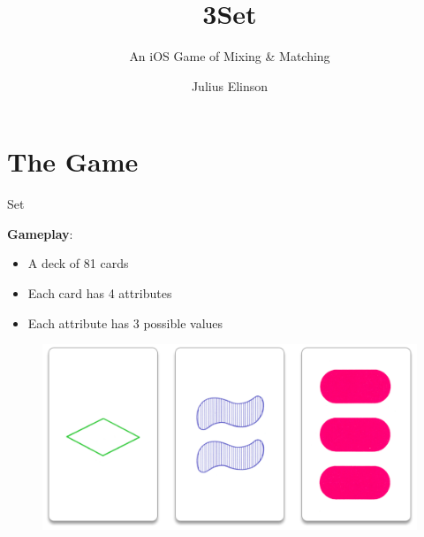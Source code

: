 \documentclass{beamer}
\author{Julius Elinson}
\title{3Set}
\subtitle{An iOS Game of Mixing \& Matching}
\institute{Aquincum Institute of Technology\\Harvey Mudd College}
\begin{document}
{
\begin{frame}
\maketitle
\end{frame}
}


\section{The Game}
\begin{frame}[t]{Set}

\textbf{Gameplay}:
\begin{itemize}
 \item A deck of 81 cards
 \item Each card has 4 attributes
 \item Each attribute has 3 possible values
\end{itemize}
\pause


\begin{figure}
\centering 
\includegraphics[width=.5\paperwidth]{img/triplet.png}
\end{figure}
\end{frame}
\end{document}
